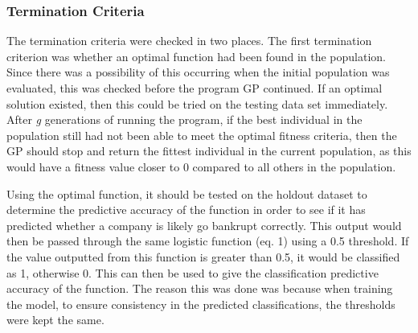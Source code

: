 \documentclass[11pt]{article}
\begin{document}
\subsubsection{Termination Criteria}\label{subsubsec:TC}
The termination criteria were checked in two places. The first termination criterion was whether an optimal function had been found in the population. Since there was a possibility of this occurring when the initial population was evaluated, this was checked before the program GP continued. If an optimal solution existed, then this could be tried on the testing data set immediately. After \textit{g} generations of running the program, if the best individual in the population still had not been able to meet the optimal fitness criteria, then the GP should stop and return the fittest individual in the current population, as this would have a fitness value closer to 0 compared to all others in the population. 

Using the optimal function, it should be tested on the holdout dataset to determine the predictive accuracy of the function in order to see if it has predicted whether a company is likely go bankrupt correctly. This output would then be passed through the same logistic function (eq. 1) using a 0.5 threshold. If the value outputted from this function is greater than 0.5, it would be classified as 1, otherwise 0. This can then be used to give the classification predictive accuracy of the function. The reason this was done was because when training the model, to ensure consistency in the predicted classifications, the thresholds were kept the same. 
\end{document}
